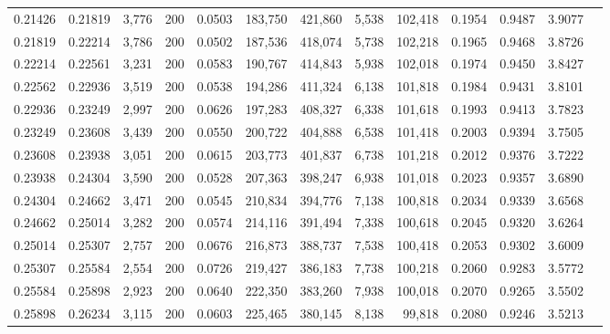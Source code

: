 \begin{tabular}{rrrrrrrrrrrrr}
0.21426 & 0.21819 &  3,776 & 200 &                                     0.0503 & 183,750 & 421,860 &   5,538 & 102,418 & 0.1954 & 0.9487 & 3.9077 \\
0.21819 & 0.22214 &  3,786 & 200 &                                     0.0502 & 187,536 & 418,074 &   5,738 & 102,218 & 0.1965 & 0.9468 & 3.8726 \\
0.22214 & 0.22561 &  3,231 & 200 &                                     0.0583 & 190,767 & 414,843 &   5,938 & 102,018 & 0.1974 & 0.9450 & 3.8427 \\
0.22562 & 0.22936 &  3,519 & 200 &                                     0.0538 & 194,286 & 411,324 &   6,138 & 101,818 & 0.1984 & 0.9431 & 3.8101 \\
0.22936 & 0.23249 &  2,997 & 200 &                                     0.0626 & 197,283 & 408,327 &   6,338 & 101,618 & 0.1993 & 0.9413 & 3.7823 \\
0.23249 & 0.23608 &  3,439 & 200 &                                     0.0550 & 200,722 & 404,888 &   6,538 & 101,418 & 0.2003 & 0.9394 & 3.7505 \\
0.23608 & 0.23938 &  3,051 & 200 &                                     0.0615 & 203,773 & 401,837 &   6,738 & 101,218 & 0.2012 & 0.9376 & 3.7222 \\
0.23938 & 0.24304 &  3,590 & 200 &                                     0.0528 & 207,363 & 398,247 &   6,938 & 101,018 & 0.2023 & 0.9357 & 3.6890 \\
0.24304 & 0.24662 &  3,471 & 200 &                                     0.0545 & 210,834 & 394,776 &   7,138 & 100,818 & 0.2034 & 0.9339 & 3.6568 \\
0.24662 & 0.25014 &  3,282 & 200 &                                     0.0574 & 214,116 & 391,494 &   7,338 & 100,618 & 0.2045 & 0.9320 & 3.6264 \\
0.25014 & 0.25307 &  2,757 & 200 &                                     0.0676 & 216,873 & 388,737 &   7,538 & 100,418 & 0.2053 & 0.9302 & 3.6009 \\
0.25307 & 0.25584 &  2,554 & 200 &                                     0.0726 & 219,427 & 386,183 &   7,738 & 100,218 & 0.2060 & 0.9283 & 3.5772 \\
0.25584 & 0.25898 &  2,923 & 200 &                                     0.0640 & 222,350 & 383,260 &   7,938 & 100,018 & 0.2070 & 0.9265 & 3.5502 \\
0.25898 & 0.26234 &  3,115 & 200 &                                     0.0603 & 225,465 & 380,145 &   8,138 &  99,818 & 0.2080 & 0.9246 & 3.5213 \\

\end{tabular}

